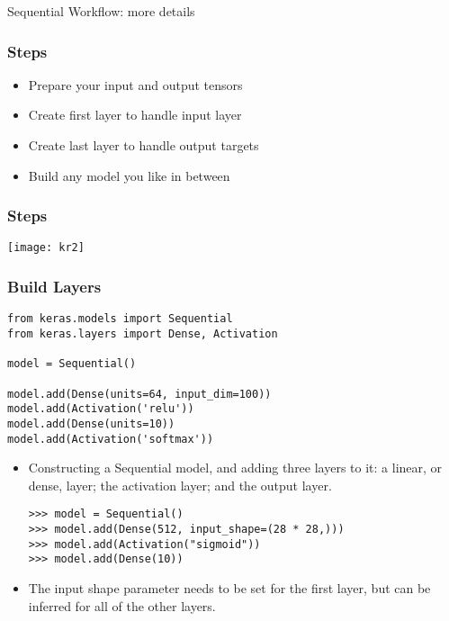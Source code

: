 \begin{frame}
  \begin{center}
    {\Large Sequential Workflow: more details}
    
  \end{center}
\end{frame}
\begin{frame}[fragile] \frametitle{Steps}

\begin{itemize}
\item  Prepare your 
input and 
output tensors 
\item  Create first 
layer to handle 
input layer
\item  Create last 
layer to handle 
output targets
\item Build any 
model you like 
in between
\end{itemize}
\end{frame}

\begin{frame}[fragile] \frametitle{Steps}
\begin{center}
\texttt{[image: kr2]}
\end{center}
\end{frame}

\begin{frame}[fragile] \frametitle{Build Layers}
\begin{lstlisting}
from keras.models import Sequential
from keras.layers import Dense, Activation

model = Sequential()

model.add(Dense(units=64, input_dim=100))
model.add(Activation('relu'))
model.add(Dense(units=10))
model.add(Activation('softmax'))
\end{lstlisting}

\begin{itemize}
\item Constructing a Sequential model, and
adding three layers to it: a linear, or dense, layer;
the activation layer; and the output layer.
\begin{lstlisting}
>>> model = Sequential()
>>> model.add(Dense(512, input_shape=(28 * 28,)))
>>> model.add(Activation("sigmoid"))
>>> model.add(Dense(10))
\end{lstlisting}
\item The input shape parameter needs to be set for the
first layer, but can be inferred for all of the other
layers.
\end{itemize}
\end{frame}


